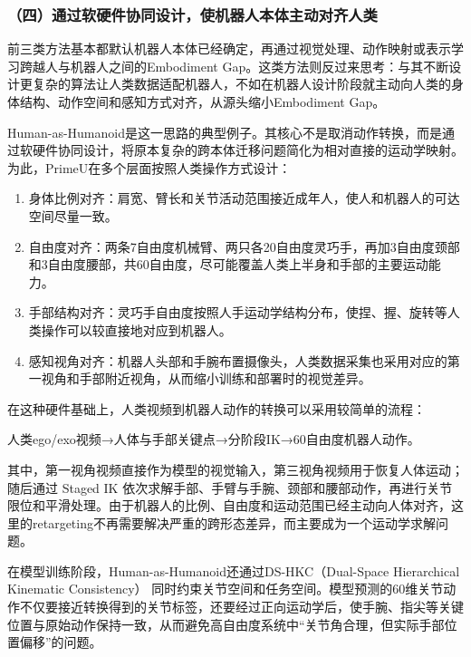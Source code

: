 \hypertarget{ux56dbux901aux8fc7ux8f6fux786cux4ef6ux534fux540cux8bbeux8ba1ux4f7fux673aux5668ux4ebaux672cux4f53ux4e3bux52a8ux5bf9ux9f50ux4ebaux7c7b}{%
\subsubsection{（四）通过软硬件协同设计，使机器人本体主动对齐人类}\label{ux56dbux901aux8fc7ux8f6fux786cux4ef6ux534fux540cux8bbeux8ba1ux4f7fux673aux5668ux4ebaux672cux4f53ux4e3bux52a8ux5bf9ux9f50ux4ebaux7c7b}}

前三类方法基本都默认机器人本体已经确定，再通过视觉处理、动作映射或表示学习跨越人与机器人之间的Embodiment Gap。这类方法则反过来思考：与其不断设计更复杂的算法让人类数据适配机器人，不如在机器人设计阶段就主动向人类的身体结构、动作空间和感知方式对齐，从源头缩小Embodiment Gap。

Human-as-Humanoid是这一思路的典型例子。其核心不是取消动作转换，而是通过软硬件协同设计，将原本复杂的跨本体迁移问题简化为相对直接的运动学映射。为此，PrimeU在多个层面按照人类操作方式设计：

\begin{enumerate}
\def\labelenumi{\arabic{enumi}.}
\item
  身体比例对齐：肩宽、臂长和关节活动范围接近成年人，使人和机器人的可达空间尽量一致。
\item
  自由度对齐：两条7自由度机械臂、两只各20自由度灵巧手，再加3自由度颈部和3自由度腰部，共60自由度，尽可能覆盖人类上半身和手部的主要运动能力。
\item
  手部结构对齐：灵巧手自由度按照人手运动学结构分布，使捏、握、旋转等人类操作可以较直接地对应到机器人。
\item
  感知视角对齐：机器人头部和手腕布置摄像头，人类数据采集也采用对应的第一视角和手部附近视角，从而缩小训练和部署时的视觉差异。
\end{enumerate}

在这种硬件基础上，人类视频到机器人动作的转换可以采用较简单的流程：

人类ego/exo视频→人体与手部关键点→分阶段IK→60自由度机器人动作。

其中，第一视角视频直接作为模型的视觉输入，第三视角视频用于恢复人体运动；随后通过 Staged IK 依次求解手部、手臂与手腕、颈部和腰部动作，再进行关节限位和平滑处理。由于机器人的比例、自由度和运动范围已经主动向人体对齐，这里的retargeting不再需要解决严重的跨形态差异，而主要成为一个运动学求解问题。

在模型训练阶段，Human-as-Humanoid还通过DS-HKC（Dual-Space Hierarchical Kinematic Consistency） 同时约束关节空间和任务空间。模型预测的60维关节动作不仅要接近转换得到的关节标签，还要经过正向运动学后，使手腕、指尖等关键位置与原始动作保持一致，从而避免高自由度系统中``关节角合理，但实际手部位置偏移''的问题。

